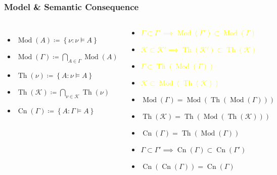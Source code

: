 \documentclass[UTF8,aspectratio=43,11pt,colorlinks,compress,openany]{beamer}%
\begin{document}
\begin{frame}\frametitle{Model \& Semantic Consequence}
\begin{columns}
	\begin{itemize}
		\item $\operatorname{Mod}(A)\coloneqq \left\{\nu: \nu\vDash A\right\}$
		\item $\operatorname{Mod}(\Gamma)\coloneqq \bigcap\limits_{A\in\Gamma}\operatorname{Mod}(A)$
		\item $\operatorname{Th}(\nu)\coloneqq \left\{A: \nu\vDash A\right\}$
		\item $\operatorname{Th}(\mathcal{K})\coloneqq \bigcap\limits_{\nu\in\mathcal{K}}\operatorname{Th}(\nu)$
		\item $\operatorname{Cn}(\Gamma)\coloneqq \left\{A: \Gamma\vDash A\right\}$
	\end{itemize}
	\begin{block}{}
		\begin{itemize}
			\item \textcolor{yellow}{$\Gamma\subset\Gamma'\implies\operatorname{Mod}(\Gamma')\subset\operatorname{Mod}(\Gamma)$}
			\item \textcolor{yellow}{$\mathcal{K}\subset\mathcal{K}'\implies\operatorname{Th}(\mathcal{K}')\subset\operatorname{Th}(\mathcal{K})$}
			\item \textcolor{yellow}{$\Gamma\subset\operatorname{Th}(\operatorname{Mod}(\Gamma))$}
			\item \textcolor{yellow}{$\mathcal{K}\subset\operatorname{Mod}(\operatorname{Th}(\mathcal{K}))$}
			\item $\operatorname{Mod}(\Gamma)=\operatorname{Mod}(\operatorname{Th}(\operatorname{Mod}(\Gamma)))$
			\item $\operatorname{Th}(\mathcal{K})=\operatorname{Th}(\operatorname{Mod}(\operatorname{Th}(\mathcal{K})))$
			\item $\operatorname{Cn}(\Gamma)=\operatorname{Th}(\operatorname{Mod}(\Gamma))$
			\item $\Gamma\subset\Gamma'\implies \operatorname{Cn}(\Gamma)\subset \operatorname{Cn}(\Gamma')$
			\item $\operatorname{Cn}(\operatorname{Cn}(\Gamma))=\operatorname{Cn}(\Gamma)$
		\end{itemize}
	\end{block}
\end{columns}
\end{frame}
\end{document}
